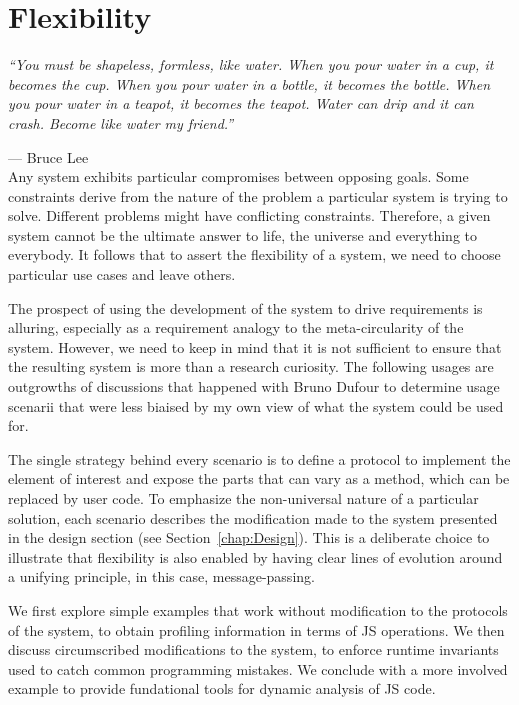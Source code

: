 \chapter{Flexibility}
\label{chap:Flexibility}

\emph{``You must be shapeless, formless, like water. When you pour water in a
cup, it becomes the cup. When you pour water in a bottle, it becomes the
bottle. When you pour water in a teapot, it becomes the teapot. Water can drip
and it can crash. Become like water my friend.''}

--- Bruce Lee \\

Any system exhibits particular compromises between opposing goals. Some
constraints derive from the nature of the problem a particular system is trying
to solve. Different problems might have conflicting constraints. Therefore, a
given system cannot be the ultimate answer to life, the universe and everything
to everybody. It follows that to assert the flexibility of a system, we need to
choose particular use cases and leave others.

The prospect of using the development of the system to drive requirements is
alluring, especially as a requirement analogy to the meta-circularity of the
system. However, we need to keep in mind that it is not sufficient to ensure
that the resulting system is more than a research curiosity. The following
usages are outgrowths of discussions that happened with Bruno Dufour to
determine usage scenarii that were less biaised by my own view of what the
system could be used for.

The single strategy behind every scenario is to define a protocol to implement
the element of interest and expose the parts that can vary as a method, which
can be replaced by user code. To emphasize the non-universal nature of a
particular solution, each scenario describes the modification made to the
system presented in the design section (see Section~\ref{chap:Design}).  This
is a deliberate choice to illustrate that flexibility is also enabled by having
clear lines of evolution around a unifying principle, in this case,
message-passing.

We first explore simple examples that work without modification to the
protocols of the system, to obtain profiling information in terms of JS operations.
We then discuss circumscribed modifications to the system, to enforce runtime
invariants used to catch common programming mistakes. We conclude with a more
involved example to provide fundational tools for dynamic analysis of JS code.

